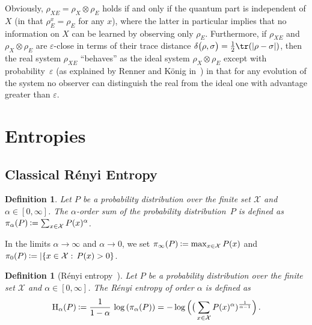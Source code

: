 \documentclass[final,11pt,a4paper]{report}
\newtheorem{definition}[theorem]{Definition}
\newcommand*{\assign}{\ensuremath{\kern.5ex\raisebox{.1ex}{\mbox{\rm:}}\kern -.3em =}}
\newcommand*{\cX}{\mathcal{X}}
\newcommand*{\Set}[2]{\{#1:\,#2\}}     %
\renewcommand*{\H}{\operatorname{H}}   %
\newcommand*{\dist}[1]{\delta\big(#1\big)}  %
\newcommand*{\regE}{E}
\begin{document}
Obviously, $\rho_{X\regE} = \rho_X \otimes \rho_\regE$ holds if and only if
the quantum part is independent of $X$ (in that $\rho_\regE^x = \rho_\regE$ for
any $x$), where the latter in particular implies that no information
on $X$ can be learned by observing only $\rho_{\regE}$.  Furthermore, if
$\rho_{X\regE}$ and $\rho_X \otimes \rho_\regE$ are
$\varepsilon$-close in terms of their trace distance
$\dist{ \rho,\sigma } = \frac{1}{2} \tr(|\rho-\sigma|)$, then the real
system $\rho_{X\regE}$ ``behaves'' as the ideal system $\rho_X \otimes
\rho_\regE$ except with probability~$\varepsilon$ (as explained by
Renner and K\"onig in~\cite{RK05}) in that
for any evolution of the system no observer can distinguish the real
from the ideal one with advantage greater than $\varepsilon$.



\section{Entropies}\label{sec:entropies}
\subsection{Classical R\'enyi Entropy} \label{app:Renyi}
\begin{definition} \label{def:ordersum}
  Let $P$ be a probability distribution over the finite set $\cX$
  and $\alpha \in [0,\infty]$. The \emph{$\alpha$-order sum} of the
  probability distribution~$P$ is defined as $\pi_\alpha(P) \assign
  \sum_{x \in \cX} P(x)^\alpha$.
\end{definition}

In the limits $\alpha \rightarrow \infty$ and $\alpha \rightarrow 0$,
we set $\pi_\infty(P) \assign \max_{x \in \cX} P(x)$ and $\pi_0(P) \assign
|\Set{x \in \cX}{P(x)>0}$.

\begin{definition}[R\'enyi entropy~\cite{Renyi61}] \label{def:renyi}
  Let $P$ be a probability distribution over the finite set $\cX$ and
  $\alpha \in [0,\infty]$. The {\em R\'enyi entropy of order $\alpha$}
  is defined as
$$
\H_{\alpha}(P) \assign \frac{1}{1-\alpha} \, \log \left(
  \pi_{\alpha}(P) \right) = - \log \Big( \big(\sum_{x \in \cX}
P(x)^{\alpha})^{\frac{1}{\alpha-1}} \Big) \, .
$$
\end{definition}
\end{document}
